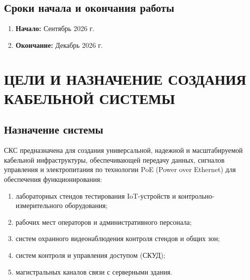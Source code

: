 \documentclass{bmstu}
\begin{document}
\begin{appendices}
\subsection{Сроки начала и окончания работы}
\begin{enumerate}[label=\thesection.\arabic*]
    \item \textbf{Начало:} Сентябрь 2026 г.
    \item \textbf{Окончание:} Декабрь 2026 г.
\end{enumerate}


\section{ЦЕЛИ И НАЗНАЧЕНИЕ СОЗДАНИЯ КАБЕЛЬНОЙ СИСТЕМЫ}

\subsection{Назначение системы}
СКС предназначена для создания универсальной, надежной и масштабируемой кабельной инфраструктуры, обеспечивающей передачу данных, сигналов управления и электропитания по технологии PoE (Power over Ethernet) для обеспечения функционирования:
\begin{enumerate}[label=\asbuk*)]
    \item лабораторных стендов тестирования IoT-устройств и контрольно-измерительного оборудования;
    \item рабочих мест операторов и административного персонала;
    \item систем охранного видеонаблюдения контроля стендов и общих зон;
    \item систем контроля и управления доступом (СКУД);
    \item магистральных каналов связи с серверными здания.
\end{enumerate}


\end{appendices}
\end{document}
